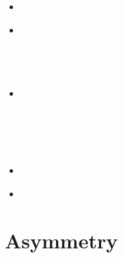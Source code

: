 \begin{scriptsize}
\begin{itemize}
\textcite{onmz17} \\
\textcite{rogj17} \\
\item[\twothousandeighteen]  
\textcite{fole18} \\
\item[\twothousandnineteen]  
\textcite{canc19} \\ 
\textcite{canc19b} \\ 
\textcite{gery19} \\
\textcite{jart19b} \\
\item[\twothousandtwenty]    
\textcite{chcg20} \\ 
\textcite{grco20} \\
\textcite{canc20} \\
\textcite{gumc20} \\
\textcite{fole20} \\
\item[\twothousandtwentyone]
\textcite{pegz21}     
\item[\twothousandtwentytwo]
\textcite{wakw22}     
\end{itemize}
\end{scriptsize}


\section{Asymmetry}
\label{sec:topics:asymmetry}

